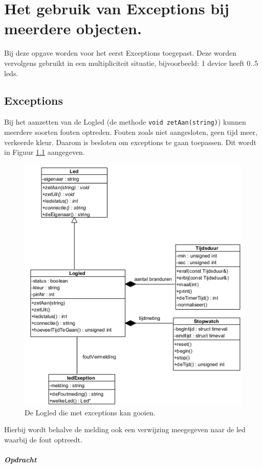 \chapter{Het gebruik van Exceptions bij meerdere objecten.} \label{chap:Excep}

Bij deze opgave worden voor het eerst Exceptions toegepast. Deze worden vervolgens gebruikt in een multipliciteit situatie, bijvoorbeeld: 1 device heeft 0..5 leds.

\section{Exceptions} 
Bij het aanzetten van de Logled (de methode \texttt{void zetAan(string)}) kunnen meerdere soorten fouten optreden. Fouten zoals niet aangesloten, geen tijd meer, verkeerde kleur. Daarom is besloten om  exceptions te gaan toepassen. Dit wordt in Figuur \ref{fig:llExc} aangegeven.
\begin{figure}[h!]
	\captionsetup{justification=centering}
	\includegraphics[width=0.9 \linewidth]{figuren/llExcept}     
\centering
\caption{De Logled die met exceptions kan gooien.}
\label{fig:llExc}
\end{figure} 
Hierbij wordt behalve de melding ook een verwijzing meegegeven naar de led waarbij de fout optreedt.
\newpage
\paragraph{Opdracht}

